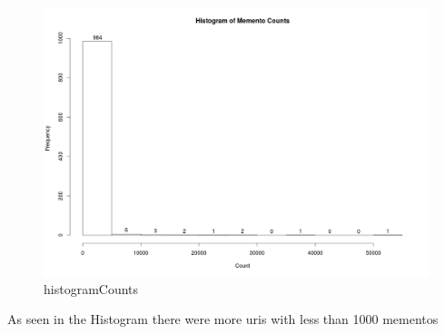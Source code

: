 \documentclass[letterpaper,10pt]{article}
\begin{document}

    
\begin{figure}[!ht]
\includegraphics[scale=0.3]{images/CountHist.png}
\caption{histogramCounts}
\label{fig:bt1}
\end{figure}

As seen in the Histogram there were more uris with less than 1000 mementos

 \newpage  
 
\newpage    
  
 \newpage  

\end{document}
